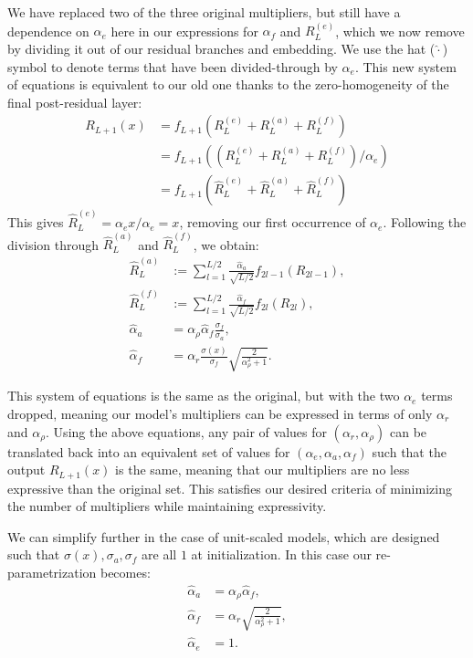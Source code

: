 We have replaced two of the three original multipliers, but still have a dependence on $\alpha_e$ here in our expressions for $\alpha_f$ and $R_L^{(e)}$, which we now remove by dividing it out of our residual branches and embedding. We use the hat ($\hat{\cdot}$) symbol to denote terms that have been divided-through by $\alpha_e$. This new system of equations is equivalent to our old one thanks to the zero-homogeneity of the final post-residual layer:
%
\begin{align*}
    R_{L+1}(x) &= f_{L+1}(R_L^{(e)} + R_L^{(a)} + R_L^{(f)})
    \\
    &= f_{L+1}((R_L^{(e)} + R_L^{(a)} + R_L^{(f)})/\alpha_e)
    \\
    &= f_{L+1}(\hat{R}_L^{(e)} + \hat{R}_L^{(a)} + \hat{R}_L^{(f)})
\end{align*}
%
This gives $\hat{R}_L^{(e)} = \alpha_e x / \alpha_e = x$, removing our first occurrence of $\alpha_e$. Following the division through $\hat{R}_L^{(a)}$ and $\hat{R}_L^{(f)}$, we obtain:
\begin{align*}
    \hat{R}_L^{(a)} &:= \sum_{l=1}^{L/2} \frac{\hat{\alpha}_a}{\sqrt{L/2}} f_{2l-1}(R_{2l-1}),
    \\
    \hat{R}_L^{(f)} &:= \sum_{l=1}^{L/2} \frac{\hat{\alpha}_f}{\sqrt{L/2}} f_{2l}(R_{2l}),
    \\
    \hat{\alpha}_a &= \alpha_\rho \hat{\alpha}_f \frac{\sigma_f}{\sigma_a},
    \\
    \hat{\alpha}_f &= \alpha_r \frac{\sigma(x)}{\sigma_f} \sqrt{\frac{2}{\alpha_\rho^2 + 1}}.
\end{align*}

This system of equations is the same as the original, but with the two $\alpha_e$ terms dropped, meaning our model's multipliers can be expressed in terms of only $\alpha_r$ and $\alpha_\rho$. Using the above equations, any pair of values for $(\alpha_r, \alpha_\rho)$ can be translated back into an equivalent set of values for $(\alpha_e, \alpha_a, \alpha_f)$ such that the output $R_{L+1}(x)$ is the same, meaning that our multipliers are no less expressive than the original set. This satisfies our desired criteria of minimizing the number of multipliers while maintaining expressivity.

We can simplify further in the case of unit-scaled models, which are designed such that $\sigma(x), \sigma_a, \sigma_f$ are all $1$ at initialization. In this case our re-parametrization becomes:
\begin{align}
    \hat{\alpha}_a &= \alpha_\rho \hat{\alpha}_f,
    \label{eq:us_residual_eqs_a} \\
    \hat{\alpha}_f &= \alpha_r \sqrt{\frac{2}{\alpha_\rho^2 + 1}},
    \label{eq:us_residual_eqs_b} \\
    \hat{\alpha}_e &= 1.
    \label{eq:us_residual_eqs_c}
\end{align}

